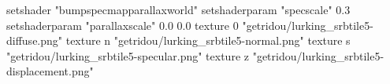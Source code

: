 setshader "bumpspecmapparallaxworld"
setshaderparam "specscale" 0.3
setshaderparam "parallaxscale" 0.0 0.0
texture 0 "getridou/lurking_srbtile5-diffuse.png"
texture n "getridou/lurking_srbtile5-normal.png"
texture s "getridou/lurking_srbtile5-specular.png"
texture z "getridou/lurking_srbtile5-displacement.png"